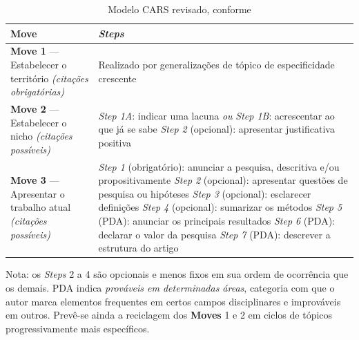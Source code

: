 \begin{table}[H]
\centering
\caption{Modelo CARS revisado, conforme \cite{ResearchGenres}}
\label{tab:cars}
\begin{tabular}{@{}p{}p{}@{}}
\toprule
\textbf{Move} & \textit{Steps} \\
\midrule
\textbf{Move 1} --- Estabelecer o território \newline \textit{(citações
obrigatórias)} &
Realizado por generalizações de tópico de especificidade crescente \\
\addlinespace
\textbf{Move 2} --- Estabelecer o nicho \newline \textit{(citações possíveis)} &
\textit{Step 1A}: indicar uma lacuna \newline
\hspace*{1em} \textit{ou} \newline
\textit{Step 1B}: acrescentar ao que já se sabe \newline
\textit{Step 2} (opcional): apresentar justificativa positiva \\
\addlinespace
\textbf{Move 3} --- Apresentar o trabalho atual \newline \textit{(citações
possíveis)} &
\textit{Step 1} (obrigatório): anunciar a pesquisa, descritiva e/ou
propositivamente \newline
\textit{Step 2} (opcional): apresentar questões de pesquisa ou hipóteses
\newline
\textit{Step 3} (opcional): esclarecer definições \newline
\textit{Step 4} (opcional): sumarizar os métodos \newline
\textit{Step 5} (PDA): anunciar os principais resultados \newline
\textit{Step 6} (PDA): declarar o valor da pesquisa \newline
\textit{Step 7} (PDA): descrever a estrutura do artigo \\
\bottomrule
\end{tabular}
\begin{flushleft}
\footnotesize
Nota: os \textit{Steps} 2 a 4 são opcionais e menos fixos em sua ordem de
ocorrência que os demais. PDA indica \textit{prováveis em determinadas áreas},
categoria com que o autor marca elementos frequentes em certos campos
disciplinares e improváveis em outros. Prevê-se ainda a reciclagem dos
\textbf{Moves} 1 e 2 em ciclos de tópicos progressivamente mais específicos.
\end{flushleft}
\end{table}

